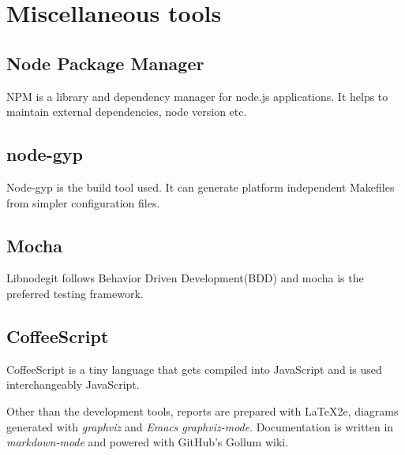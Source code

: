 \section{Miscellaneous tools}

\subsection{Node Package Manager}
NPM is a library and dependency manager for node.js applications. It helps to
maintain external dependencies, node version etc.

\subsection{node-gyp}
Node-gyp is the build tool used. It can generate platform independent Makefiles
from simpler configuration files.

\subsection{Mocha}
Libnodegit follows Behavior Driven Development(BDD) and mocha is the preferred
testing framework.

\subsection{CoffeeScript}
CoffeeScript is a tiny language that gets compiled into JavaScript and is used
interchangeably JavaScript.

Other than the development tools, reports are prepared with \LaTeX2e, diagrams
generated with \textit{graphviz} and \textit{Emacs} \textit{graphviz-mode}.
Documentation is written in \textit{markdown-mode} and powered with GitHub's
Gollum wiki.
